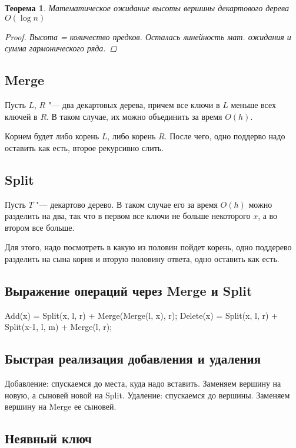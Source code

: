 \documentclass[12pt,a4paper]{article}
\theoremstyle{plain}
\newtheorem{thm}{Теорема}
\begin{document}
\begin{thm}
Математическое ожидание высоты вершины декартового дерева $O(\log{n})$
\begin{proof}
Высота = количество предков. Осталась линейность мат. ожидания и сумма гармонического ряда.
\end{proof}
\end{thm}

\subsection{Merge}

Пусть $L$, $R$ "--- два декартовых дерева, причем все ключи в $L$ меньше всех ключей в $R$.
В таком случае, их можно объединить за время $O(h)$.

Корнем будет либо корень $L$, либо корень $R$. После чего, одно поддерво надо оставить как есть, второе рекурсивно слить.

\subsection{Split}

Пусть $T$ "--- декартово дерево. В таком случае его за время $O(h)$ можно разделить на два, так что в первом все ключи не больше некоторого $x$,
а во втором все больше.

Для этого, надо посмотреть в какую из половин пойдет корень, одно поддерево разделить на сына корня и вторую половину ответа, одно оставить как есть.

\subsection{Выражение операций через Merge и Split}

Add(x) = Split(x, l, r) + Merge(Merge(l, x), r);
Delete(x) = Split(x, l, r) + Split(x-1, l, m) + Merge(l, r);

\subsection{Быстрая реализация добавления и удаления}

Добавление: спускаемся до места, куда надо вставить. Заменяем вершину на новую, а сыновей новой на Split.
Удаление: спускаемся до вершины. Заменяем вершину на Merge ее сыновей.


\subsection{Неявный ключ}
\end{document}
